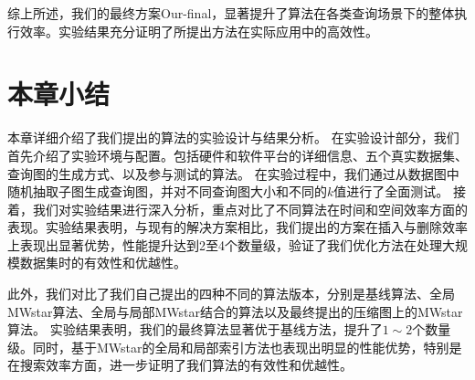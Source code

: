 综上所述，我们的最终方案Our-final，显著提升了算法在各类查询场景下的整体执行效率。实验结果充分证明了所提出方法在实际应用中的高效性。

\section{本章小结}
本章详细介绍了我们提出的算法的实验设计与结果分析。
在实验设计部分，我们首先介绍了实验环境与配置。包括硬件和软件平台的详细信息、五个真实数据集、查询图的生成方式、以及参与测试的算法。
在实验过程中，我们通过从数据图中随机抽取子图生成查询图，并对不同查询图大小和不同的$k$值进行了全面测试。
接着，我们对实验结果进行深入分析，重点对比了不同算法在时间和空间效率方面的表现。实验结果表明，与现有的解决方案相比，我们提出的方案在插入与删除效率上表现出显著优势，性能提升达到2至4个数量级，验证了我们优化方法在处理大规模数据集时的有效性和优越性。

此外，我们对比了我们自己提出的四种不同的算法版本，分别是基线算法、全局MWstar算法、全局与局部MWstar结合的算法以及最终提出的压缩图上的MWstar算法。
实验结果表明，我们的最终算法显著优于基线方法，提升了$1\sim2$个数量级。同时，基于MWstar的全局和局部索引方法也表现出明显的性能优势，特别是在搜索效率方面，进一步证明了我们算法的有效性和优越性。
